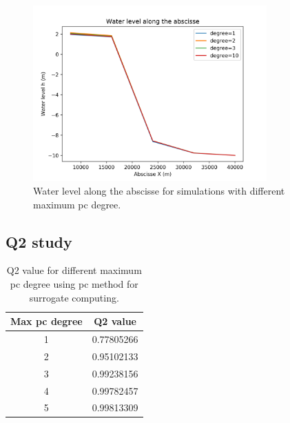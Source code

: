 \documentclass[hidelinks,12pt]{article}
\begin{document}
\begin{figure}
  \centering
  \includegraphics[width=0.8\textwidth]{images/influence_degree_method_surrogate_pc.png}
  \caption{Water level along the abscisse for simulations with different maximum pc degree.}
  	\label{influence_init_size_method_surrogate_kriging}
\end{figure}

\subsection{Q2 study}

\begin{table}
\begin{tabular}{|c|c|}
  \hline
  Max pc degree & Q2 value \\
  \hline
  1 & 0.77805266\\
  2 & 0.95102133\\
  3 & 0.99238156\\
  4 & 0.99782457\\
  5 & 0.99813309\\
  \hline
\end{tabular}
\caption{Q2 value for different maximum pc degree using pc method for surrogate computing.}
\end{table}
\end{document}
